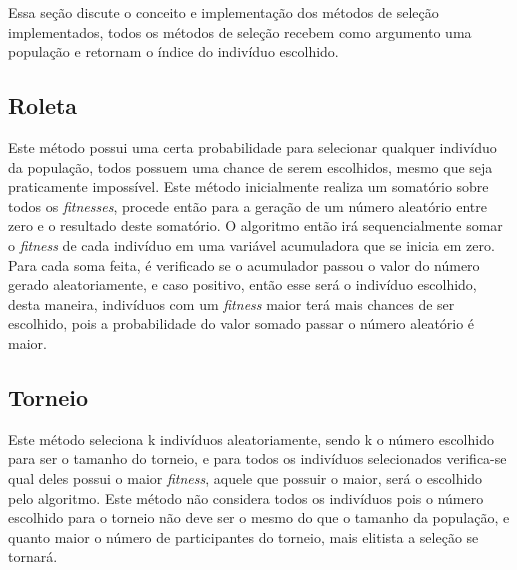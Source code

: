 \documentclass[12pt]{article}
\begin{document}
Essa seção discute o conceito e implementação dos métodos de seleção implementados, todos os métodos de seleção recebem como argumento uma população e 
retornam o índice do indivíduo escolhido.

\subsection{Roleta}

Este método possui uma certa probabilidade para selecionar qualquer indivíduo da população, todos possuem uma chance de serem escolhidos, 
mesmo que seja praticamente impossível. Este método inicialmente realiza um somatório sobre todos os \textit{fitnesses}, procede então para a 
geração de um número aleatório entre zero e o resultado deste somatório. O algoritmo então irá sequencialmente somar o \textit{fitness} de cada 
indivíduo em uma variável acumuladora que se inicia em zero. Para cada soma feita, é verificado se o acumulador passou o valor do número gerado 
aleatoriamente, e caso positivo, então esse será o indivíduo escolhido, desta maneira, indivíduos com um \textit{fitness} maior terá mais chances 
de ser escolhido, pois a probabilidade do valor somado passar o número aleatório é maior.

\subsection{Torneio}

Este método seleciona k indivíduos aleatoriamente, sendo k o número escolhido para ser o tamanho do torneio, e para todos os indivíduos selecionados 
verifica-se qual deles possui o maior \textit{fitness}, aquele que possuir o maior, será o escolhido pelo algoritmo. Este método não considera todos os 
indivíduos pois o número escolhido para o torneio não deve ser o mesmo do que o tamanho da população, e quanto maior o número de participantes do torneio, 
mais elitista a seleção se tornará.
    


\end{document}
